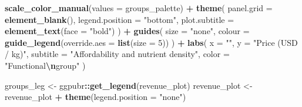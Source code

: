 \documentclass[
]{book}
\newenvironment{Shaded}{\begin{snugshade}}{\end{snugshade}}
\newcommand{\AttributeTok}[1]{\textcolor[rgb]{0.13,0.29,0.53}{#1}}
\newcommand{\DecValTok}[1]{\textcolor[rgb]{0.00,0.00,0.81}{#1}}
\newcommand{\FunctionTok}[1]{\textcolor[rgb]{0.13,0.29,0.53}{\textbf{#1}}}
\newcommand{\NormalTok}[1]{#1}
\newcommand{\OtherTok}[1]{\textcolor[rgb]{0.56,0.35,0.01}{#1}}
\newcommand{\SpecialCharTok}[1]{\textcolor[rgb]{0.81,0.36,0.00}{\textbf{#1}}}
\newcommand{\StringTok}[1]{\textcolor[rgb]{0.31,0.60,0.02}{#1}}
\begin{document}
\begin{Shaded}
\begin{Highlighting}[]
  \FunctionTok{scale\_color\_manual}\NormalTok{(}\AttributeTok{values =}\NormalTok{ groups\_palette) }\SpecialCharTok{+}
  \FunctionTok{theme}\NormalTok{(}
    \AttributeTok{panel.grid =} \FunctionTok{element\_blank}\NormalTok{(),}
    \AttributeTok{legend.position =} \StringTok{"bottom"}\NormalTok{,}
    \AttributeTok{plot.subtitle =} \FunctionTok{element\_text}\NormalTok{(}\AttributeTok{face =} \StringTok{"bold"}\NormalTok{)}
\NormalTok{  ) }\SpecialCharTok{+}
  \FunctionTok{guides}\NormalTok{(}
    \AttributeTok{size =} \StringTok{"none"}\NormalTok{,}
    \AttributeTok{colour =} \FunctionTok{guide\_legend}\NormalTok{(}\AttributeTok{override.aes =} \FunctionTok{list}\NormalTok{(}\AttributeTok{size =} \DecValTok{5}\NormalTok{))}
\NormalTok{  ) }\SpecialCharTok{+}
  \FunctionTok{labs}\NormalTok{(}
    \AttributeTok{x =} \StringTok{""}\NormalTok{,}
    \AttributeTok{y =} \StringTok{"Price (USD / kg)"}\NormalTok{,}
    \AttributeTok{subtitle =} \StringTok{"Affordability and nutrient density"}\NormalTok{,}
    \AttributeTok{color =} \StringTok{"Functional}\SpecialCharTok{\textbackslash{}n}\StringTok{group"}
\NormalTok{  )}


\NormalTok{groups\_leg }\OtherTok{\textless{}{-}}\NormalTok{ ggpubr}\SpecialCharTok{::}\FunctionTok{get\_legend}\NormalTok{(revenue\_plot)}
\NormalTok{revenue\_plot }\OtherTok{\textless{}{-}}
\NormalTok{  revenue\_plot }\SpecialCharTok{+}
  \FunctionTok{theme}\NormalTok{(}\AttributeTok{legend.position =} \StringTok{"none"}\NormalTok{)}


\end{Highlighting}
\end{Shaded}
\end{document}
